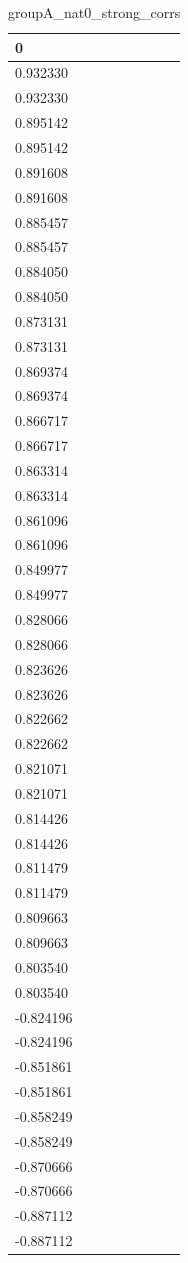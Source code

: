 \begin{table}
\caption{groupA_nat0_strong_corrs}
\label{tab:groupA_nat0_strong_corrs}
\begin{tabular}{lcr}
\toprule
0 \\
\midrule
0.932330 \\
0.932330 \\
0.895142 \\
0.895142 \\
0.891608 \\
0.891608 \\
0.885457 \\
0.885457 \\
0.884050 \\
0.884050 \\
0.873131 \\
0.873131 \\
0.869374 \\
0.869374 \\
0.866717 \\
0.866717 \\
0.863314 \\
0.863314 \\
0.861096 \\
0.861096 \\
0.849977 \\
0.849977 \\
0.828066 \\
0.828066 \\
0.823626 \\
0.823626 \\
0.822662 \\
0.822662 \\
0.821071 \\
0.821071 \\
0.814426 \\
0.814426 \\
0.811479 \\
0.811479 \\
0.809663 \\
0.809663 \\
0.803540 \\
0.803540 \\
-0.824196 \\
-0.824196 \\
-0.851861 \\
-0.851861 \\
-0.858249 \\
-0.858249 \\
-0.870666 \\
-0.870666 \\
-0.887112 \\
-0.887112 \\
\bottomrule
\end{tabular}
\end{table}
